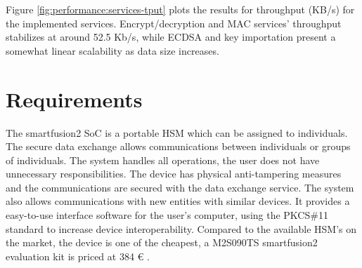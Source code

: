 Figure \ref{fig:performance:services-tput} plots the results for throughput (KB/s) for the implemented services.
Encrypt/decryption and MAC services' throughput stabilizes at around 52.5 Kb/s, while \ac{ECDSA} and key importation present a somewhat linear scalability as data size increases.




\section{Requirements}\label{chap:evaluation:requirements}

The smartfusion2 SoC is a portable HSM which can be assigned to individuals.
The secure data exchange allows communications between individuals or groups of individuals.
The system handles all operations, the user does not have unnecessary responsibilities.
The device has physical anti-tampering measures and the communications are secured with the data exchange service.
The system also allows communications with new entities with similar devices.
It provides a easy-to-use interface software for the user's computer, using the PKCS\#11 standard to increase device interoperability.
Compared to the available HSM's on the market, the device is one of the cheapest, a M2S090TS smartfusion2 evaluation kit is priced at 384 € \cite{smartfusionPrice}.

